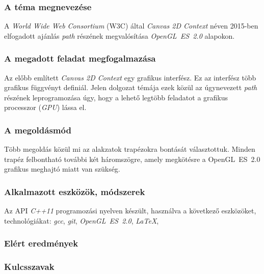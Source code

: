 \documentclass[12pt]{report}
\theoremstyle{definition}
\begin{document}

    \subsubsection*{A téma megnevezése}

A \emph{World Wide Web Consortium} (W3C) által \emph{Canvas 2D Context} néven
2015-ben elfogadott ajánlás \emph{path} részének megvalósítása \emph{OpenGL~ES~2.0} alapokon.

    \subsubsection*{A megadott feladat megfogalmazása}

Az előbb említett \emph{Canvas 2D Context} egy grafikus interfész. Ez az
interfész több grafikus függvényt definiál. Jelen dolgozat témája ezek közül az
úgynevezett \emph{path} részének leprogramozása úgy, hogy a lehető legtöbb
feladatot a grafikus processzor (\textit{GPU}) lássa el.

    \subsubsection*{A megoldásmód}

Több megoldás közül mi az alakzatok trapézokra bontását választottuk. Minden
trapéz felbontható további két háromszögre, amely megkötésre a OpenGL~ES~2.0
grafikus meghajtó miatt van szükség.

    \subsubsection*{Alkalmazott eszközök, módszerek}

Az API \emph{C++11} programozási nyelven készült, használva a következő
eszközöket, technológiákat: \emph{gcc}, \emph{git}, \textit{OpenGL~ES~2.0},
\emph{\LaTeX},

    \subsubsection*{Elért eredmények}

    \subsubsection*{Kulcsszavak}
\end{document}
